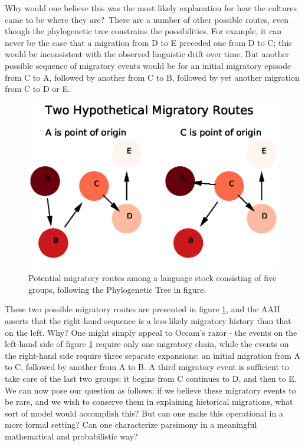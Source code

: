 \documentclass[11pt]{article}
\begin{document}
Why would one believe this was the most likely explanation for how the cultures came to be where they are?\ There are a number of other possible routes, even though the phylogenetic tree constrains the possibilities. For example, it can never be the case that a migration from D to E preceded one from D to C; this would be inconsistent with the observed linguistic drift over time. But another possible  sequence of migratory events would be for an initial migratory episode from C to A, followed by another from C to B, followed by yet another migration from C to D or E.

\begin{figure}
\begin{center} 
\includegraphics[width=\textwidth]{AncillaryFiles//figure2.eps} 
\caption{Potential migratory routes among a language stock consisting of five groups, following the Phylogenetic Tree in figure.} \label{fig2}
\end{center} 
\end{figure}

These two possible migratory routes are presented in figure \ref{fig2}, and the AAH asserts that the right-hand sequence is a less-likely migratory history than that on the left. Why? One might simply appeal to Occam's razor - the events on the left-hand side of figure \ref{fig2} require only one migratory chain, while the events on the right-hand side require three separate expansions: an initial migration from A to C, followed by another from A to B. A third migratory event is sufficient to take care of the last two groups: it begins from C continues to D, and then to E. We can now pose our question as follows: if we believe these migratory events to be rare, and we wish to conserve them in explaining historical migrations, what sort of model would accomplish this? But can one make this operational in a more formal setting? Can one characterize parsimony in a meaningful mathematical and probabilistic way? 
\end{document}
